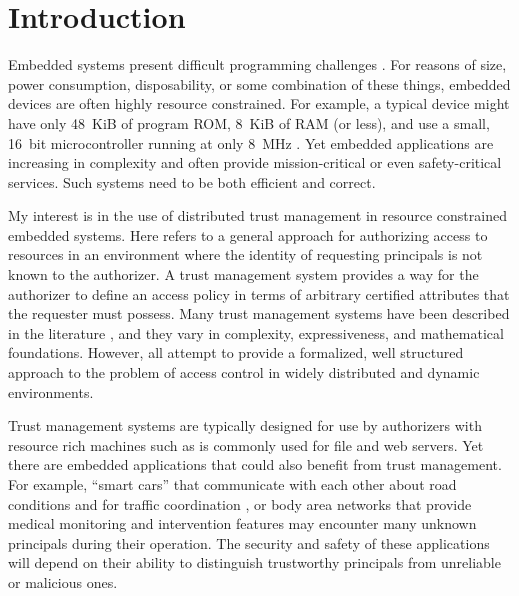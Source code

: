 \chapter{Introduction}
\label{chapter-introduction}

Embedded systems present difficult programming challenges
\cite{Mottola:2011:PWS:1922649.1922656}. For reasons of size, power consumption, disposability,
or some combination of these things, embedded devices are often highly resource constrained. For
example, a typical device might have only 48~KiB of program ROM, 8~KiB of RAM (or less), and use
a small, 16~bit microcontroller running at only 8~MHz \cite{tmotesky-datasheet}. Yet embedded
applications are increasing in complexity and often provide mission-critical or even
safety-critical services. Such systems need to be both efficient and correct.

My interest is in the use of distributed trust management in resource constrained embedded
systems. Here  refers to a general approach for authorizing access to
resources in an environment where the identity of requesting principals is not known to the
authorizer. A trust management system provides a way for the authorizer to define an access
policy in terms of arbitrary certified attributes that the requester must possess. Many trust
management systems have been described in the literature \cite{chapin-skalka-wang-acmcs08}, and
they vary in complexity, expressiveness, and mathematical foundations. However, all attempt to
provide a formalized, well structured approach to the problem of access control in widely
distributed and dynamic environments.

Trust management systems are typically designed for use by authorizers with resource rich
machines such as is commonly used for file and web servers. Yet there are embedded applications
that could also benefit from trust management. For example, ``smart cars'' that communicate with
each other about road conditions and for traffic coordination
\cite{Seepold:2009:ESP:1641563.1641568}, or body area networks that provide medical monitoring
and intervention features \cite{Shnayder:2005:SNM:1098918.1098979,Chen:2011:BAN:1968858.1968873}
may encounter many unknown principals during their operation. The security and safety of these
applications will depend on their ability to distinguish trustworthy principals from unreliable
or malicious ones.

